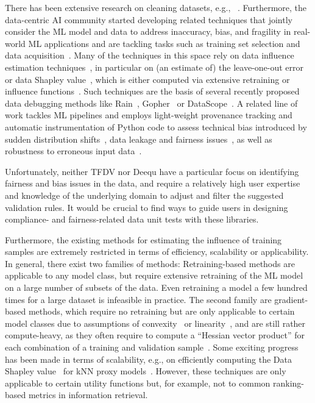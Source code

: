 There has been extensive research on cleaning datasets, e.g., ~\cite{Ziawasch2016errors,mahdavi2019raha,jager2021benchmark,narayan2022can}. Furthermore, the data-centric AI community started developing related techniques that jointly consider the ML model and data to address inaccuracy, bias, and fragility in real-world ML applications and are tackling tasks such as training set selection and data acquisition~\cite{mazumder2023dataperf}. Many of the techniques in this space rely on data influence estimation techniques~\cite{hammoudeh2022training}, in particular on (an estimate of) the leave-one-out error or data Shapley value~\cite{ghorbani2019data}, which is either computed via extensive retraining or influence functions~\cite{pmlr-v70-koh17a}. Such techniques are the basis of several recently proposed data debugging methods like Rain~\cite{wu2020complaint}, Gopher~\cite{pradhan2022interpretable} or DataScope~\cite{karlavs2022data}. 
%
A related line of work tackles ML pipelines and employs light-weight provenance tracking and automatic instrumentation of Python code to assess technical bias introduced by sudden distribution shifts~\cite{grafberger2022data,grafberger2021demo}, data leakage and fairness issues~\cite{schelter2022screening,schelter2023proactively}, as well as robustness to erroneous input data~\cite{grafberger2023mlwhatif,grafberger2023demo}. 


Unfortunately, neither TFDV nor Deequ have a particular focus on identifying fairness and bias issues in the data, and require a relatively high user expertise and knowledge of the underlying domain to adjust and filter the suggested validation rules. It would be crucial to find ways to guide users in designing compliance- and fairness-related data unit tests with these libraries. 

Furthermore, the existing methods for estimating the influence of training samples are extremely restricted in terms of efficiency, scalability or applicability. In general, there exist two families of methods: Retraining-based methods are applicable to any model class, but require extensive retraining of the ML model on a large number of subsets of the data. Even retraining a model a few hundred times for a large dataset is infeasible in practice. The second family are gradient-based methods, which require no retraining but are only applicable to certain model classes due to assumptions of convexity~\cite{pmlr-v70-koh17a} or linearity~\cite{yeh2018representer}, and are still rather compute-heavy, as they often require to compute a ``Hessian vector product'' for each combination of a training and validation sample~\cite{hammoudeh2022training}. Some exciting progress has been made in terms of scalability, e.g., on efficiently computing the Data Shapley value~\cite{ghorbani2019data} for kNN proxy models~\cite{jia2019towards}. However, these techniques are only applicable to certain utility functions but, for example, not to common ranking-based metrics in information retrieval.

